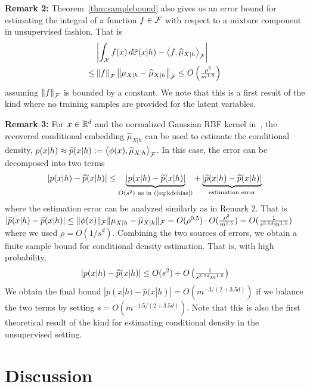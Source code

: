 \documentclass{article}
\begin{document}
{\bf Remark 2:} Theorem~\ref{thm:samplebound} also gives us an error bound for estimating the integral of a function $f\in \mathcal{F}$ with respect to a mixture component in unsupervised fashion. That is
\begin{align*}
	&\left|\int_{\mathcal{X}} f(x)\, d\mathbb{P}(x|h) - \left\langle f,\widehat \mu_{X|h} \right\rangle_{\mathcal{F}}\right| \\
	\leq& \left\|f\right\|_{\mathcal{F}} \left\|\mu_{X|h} - \widehat \mu_{X|h}\right\|_{\mathcal{F}}
	\leq O\left({\textstyle \frac{\rho^3}{m^{1.5}}}\right)
\end{align*}
assuming $\left\|f\right\|_{\mathcal{F}}$ is bounded by a constant. We note that this is a first result of the kind where no training samples are provided for the latent variables.

{\bf Remark 3:} For $x\in \mathbb{R}^d$ and the normalized Gaussian RBF kernel in~, the recovered conditional embedding $\widehat \mu_{X|h}$ can be used to estimate the conditional density, $p(x|h) \approx \widehat p(x|h) := \left\langle \phi(x),\widehat \mu_{X|h} \right\rangle_{\mathcal{F}}$. In this case, the error can be decomposed into two terms
\begin{align*}
  \abr{p(x|h) - \widehat p(x|h)}
  \leq \underbrace{\abr{p(x|h) - \widetilde p(x|h)}}_{O(s^2)~\text{as in~\eq{eq:kdebias}}} + \underbrace{\abr{\widetilde p(x|h) - \widehat p(x|h)}}_{\text{estimation error}}
\end{align*}
where the estimation error can be analyzed similarly as in Remark 2. That is
$|\widetilde p(x|h) - \widehat p(x|h)|
  \leq \|\phi(x)\|_{\mathcal{F}} \|\mu_{X|h} - \widehat \mu_{X|h}\|_{\mathcal{F}}
  =O(\rho^{0.5})\cdot O({\textstyle \frac{\rho^3}{m^{1.5}}}) = O({\textstyle \frac{1}{s^{3.5d}m^{1.5}}})
$
where we used $\rho = O(1/s^d)$.
Combining the two sources of errors, we obtain a finite sample bound for conditional density estimation. That is, with high probability,
\begin{align*}
  |p(x|h) - \widehat p(x|h)|
  \leq O(s^2) + O\left({\textstyle \frac{1}{s^{3.5d}m^{1.5}}}\right)
\end{align*}
We obtain the final bound $|p(x|h) - \widehat p(x|h)| = O(m^{-3/(2+3.5d)})$ if we balance the two terms by setting $s = O(m^{-1.5/(2+3.5d)})$.
Note that this is also the first theoretical result of the kind for estimating conditional density in the unsupervised setting.

\vspace{-3mm}
\section{Discussion}
\vspace{-2mm}
\end{document}
